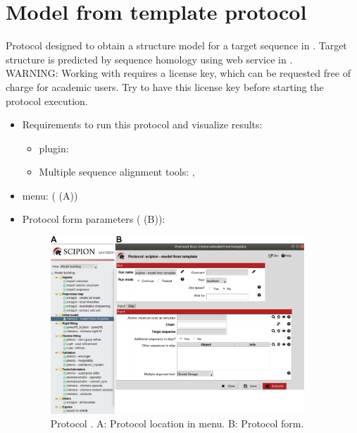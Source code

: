 \section{Model from template protocol}
\label{app:modelFromTemplate}%
Protocol designed to obtain a structure model for a target sequence in \scipion. Target structure is predicted by sequence homology using \modeller \citep{sali1993} web service in \chimera.\\
WARNING: Working with \modeller requires a license key, which can be requested free of charge for academic users. Try to have this license key before starting the protocol execution. 

   
 \begin{itemize}
  \item Requirements to run this protocol and visualize results:
    \begin{itemize}
        \item \scipion plugin: 
        \item Multiple sequence alignment tools: , 
    \end{itemize}
  \item \scipion menu:
   ( (A))
  
  \item Protocol form parameters ( (B)):
  
  \begin{figure}[H]
    \centering 
    \captionsetup{width=.7\linewidth} 
    \includegraphics[width=0.90\textwidth]{Images_appendix/Fig111.pdf}
    \caption{Protocol . A: Protocol location in \scipion menu. B: Protocol form.}
    \label{fig:app_protocol_seqHomology_1}
   \end{figure}
  

\end{itemize}
